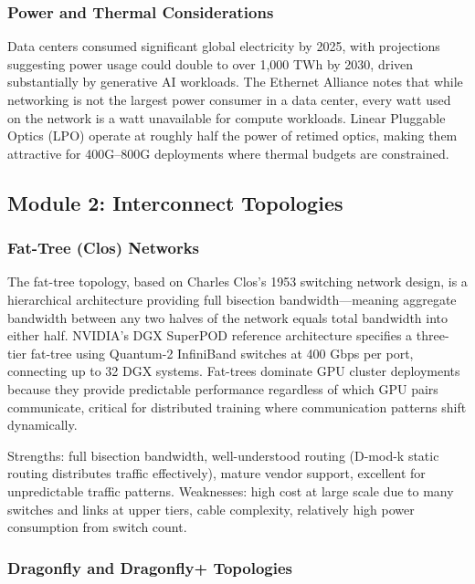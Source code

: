 \documentclass[11pt,letterpaper]{article}
\begin{document}
\subsubsection{Power and Thermal Considerations}

Data centers consumed significant global electricity by 2025, with projections suggesting power usage could double to over 1,000 TWh by 2030, driven substantially by generative AI workloads. The Ethernet Alliance notes that while networking is not the largest power consumer in a data center, every watt used on the network is a watt unavailable for compute workloads. Linear Pluggable Optics (LPO) operate at roughly half the power of retimed optics, making them attractive for 400G--800G deployments where thermal budgets are constrained.

\subsection{Module 2: Interconnect Topologies}

\subsubsection{Fat-Tree (Clos) Networks}

The fat-tree topology, based on Charles Clos's 1953 switching network design, is a hierarchical architecture providing full bisection bandwidth---meaning aggregate bandwidth between any two halves of the network equals total bandwidth into either half. NVIDIA's DGX SuperPOD reference architecture specifies a three-tier fat-tree using Quantum-2 InfiniBand switches at 400 Gbps per port, connecting up to 32 DGX systems. Fat-trees dominate GPU cluster deployments because they provide predictable performance regardless of which GPU pairs communicate, critical for distributed training where communication patterns shift dynamically.

Strengths: full bisection bandwidth, well-understood routing (D-mod-k static routing distributes traffic effectively), mature vendor support, excellent for unpredictable traffic patterns. Weaknesses: high cost at large scale due to many switches and links at upper tiers, cable complexity, relatively high power consumption from switch count.

\subsubsection{Dragonfly and Dragonfly+ Topologies}
\end{document}

